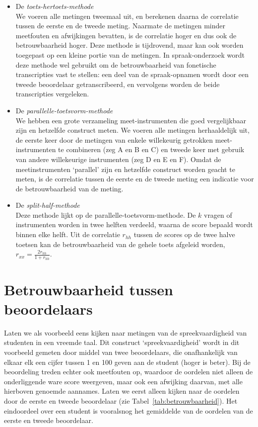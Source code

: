 \documentclass[
]{book}
\begin{document}
\begin{itemize}
\item
  De \emph{toets-hertoets-methode}\\
  We voeren alle metingen tweemaal uit, en berekenen daarna de
  correlatie tussen de eerste en de tweede meting. Naarmate de
  metingen minder meetfouten en afwijkingen bevatten, is de correlatie
  hoger en dus ook de betrouwbaarheid hoger. Deze methode is
  tijdrovend, maar kan ook worden toegepast op een kleine portie van
  de metingen. In spraak-onderzoek wordt deze methode wel gebruikt om
  de betrouwbaarheid van fonetische transcripties vast te stellen: een
  deel van de spraak-opnamen wordt door een tweede beoordelaar
  getranscribeerd, en vervolgens worden de beide transcripties
  vergeleken.
\item
  De \emph{parallelle-toetsvorm-methode}\\
  We hebben een grote verzameling meet-instrumenten die goed
  vergelijkbaar zijn en hetzelfde construct meten. We voeren alle
  metingen herhaaldelijk uit, de eerste keer door de metingen van
  enkele willekeurig getrokken meet-instrumenten te combineren (zeg A
  en B en C) en tweede keer met gebruik van andere willekeurige
  instrumenten (zeg D en E en F). Omdat de meetinstrumenten `parallel'
  zijn en hetzelfde construct worden geacht te meten, is de correlatie
  tussen de eerste en de tweede meting een indicatie voor de
  betrouwbaarheid van de meting.
\item
  De \emph{split-half-methode}\\
  Deze methode lijkt op de parallelle-toetsvorm-methode. De \(k\) vragen
  of instrumenten worden in twee helften verdeeld, waarna de score
  bepaald wordt binnen elke helft. Uit de correlatie \(r_{hh}\) tussen
  de scores op de twee halve toetsen kan de betrouwbaarheid van de
  gehele toets afgeleid worden, \(r_{xx} = \frac{2r_{hh}}{1+r_{hh}}\).
\end{itemize}

\hypertarget{betrouwbaarheid-tussen-beoordelaars}{%
\section{Betrouwbaarheid tussen beoordelaars}\label{betrouwbaarheid-tussen-beoordelaars}}

Laten we als voorbeeld eens kijken naar metingen van de
spreekvaardigheid van studenten in een vreemde taal. Dit construct
`spreekvaardigheid' wordt in dit voorbeeld gemeten door middel van twee
beoordelaars, die onafhankelijk van elkaar elk een cijfer tussen 1 en
100 geven aan de student (hoger is beter). Bij de beoordeling treden
echter ook meetfouten op, waardoor de oordelen niet alleen de
onderliggende ware score weergeven, maar ook een afwijking daarvan, met
alle hierboven genoemde aannames. Laten we eerst alleen kijken naar de
oordelen door de eerste en tweede beoordelaar (zie
Tabel~\ref{tab:betrouwbaarheid}). Het eindoordeel over een student is
vooralsnog het gemiddelde van de oordelen van de eerste en tweede
beoordelaar.
\end{document}
